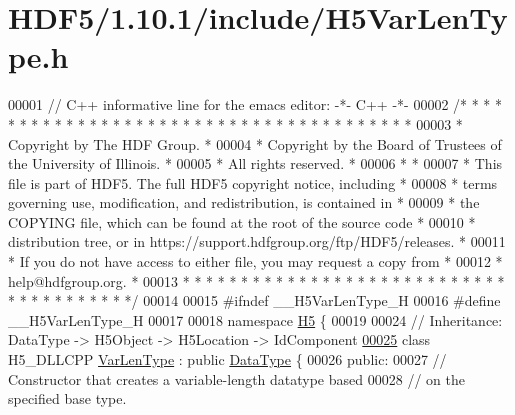 \hypertarget{_h_d_f5_21_810_81_2include_2_h5_var_len_type_8h_source}{}\section{H\+D\+F5/1.10.1/include/\+H5\+Var\+Len\+Type.h}
\label{_h_d_f5_21_810_81_2include_2_h5_var_len_type_8h_source}

\begin{DoxyCode}
00001 \textcolor{comment}{// C++ informative line for the emacs editor: -*- C++ -*-}
00002 \textcolor{comment}{/* * * * * * * * * * * * * * * * * * * * * * * * * * * * * * * * * * * * * * *}
00003 \textcolor{comment}{ * Copyright by The HDF Group.                                               *}
00004 \textcolor{comment}{ * Copyright by the Board of Trustees of the University of Illinois.         *}
00005 \textcolor{comment}{ * All rights reserved.                                                      *}
00006 \textcolor{comment}{ *                                                                           *}
00007 \textcolor{comment}{ * This file is part of HDF5.  The full HDF5 copyright notice, including     *}
00008 \textcolor{comment}{ * terms governing use, modification, and redistribution, is contained in    *}
00009 \textcolor{comment}{ * the COPYING file, which can be found at the root of the source code       *}
00010 \textcolor{comment}{ * distribution tree, or in https://support.hdfgroup.org/ftp/HDF5/releases.  *}
00011 \textcolor{comment}{ * If you do not have access to either file, you may request a copy from     *}
00012 \textcolor{comment}{ * help@hdfgroup.org.                                                        *}
00013 \textcolor{comment}{ * * * * * * * * * * * * * * * * * * * * * * * * * * * * * * * * * * * * * * */}
00014 
00015 \textcolor{preprocessor}{#ifndef \_\_H5VarLenType\_H}
00016 \textcolor{preprocessor}{#define \_\_H5VarLenType\_H}
00017 
00018 \textcolor{keyword}{namespace }\hyperlink{namespace_h5}{H5} \{
00019 
00024 \textcolor{comment}{//  Inheritance: DataType -> H5Object -> H5Location -> IdComponent}
\hyperlink{class_h5_1_1_var_len_type}{00025} \textcolor{keyword}{class }H5\_DLLCPP \hyperlink{class_h5_1_1_var_len_type}{VarLenType} : \textcolor{keyword}{public} \hyperlink{class_h5_1_1_data_type}{DataType} \{
00026    \textcolor{keyword}{public}:
00027         \textcolor{comment}{// Constructor that creates a variable-length datatype based}
00028         \textcolor{comment}{// on the specified base type.}

\end{DoxyCode}
